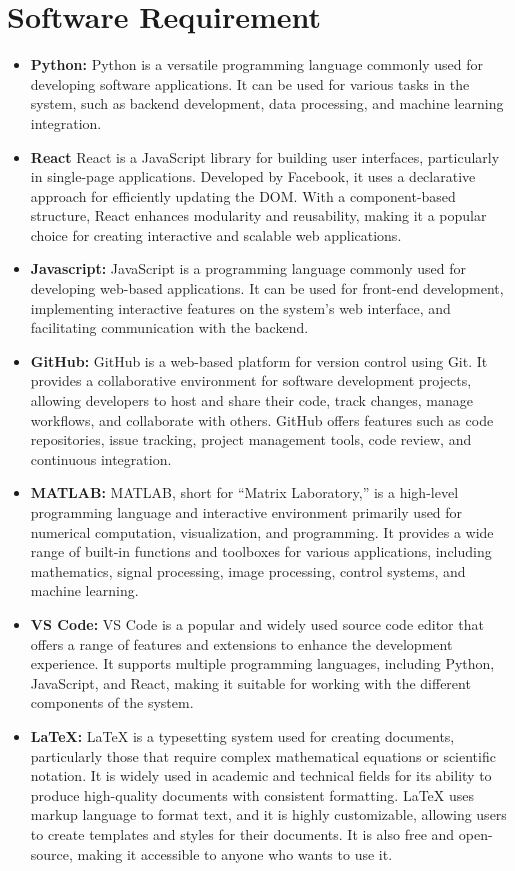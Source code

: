 \section{Software Requirement}
\begin{itemize}[noitemsep]
\item \textbf{Python:} 
Python is a versatile programming language commonly used for \mbox{developing} software applications. It can be used for various tasks in the system, such as backend development, data processing, and machine learning integration.
\item \textbf{React }
 React is a JavaScript library for building user interfaces, particularly in single-page applications. Developed by Facebook, it uses a declarative approach for efficiently updating the DOM. With a component-based structure, React enhances modularity and reusability, making it a popular choice for creating interactive and scalable web applications.
\item \textbf{Javascript:}
JavaScript is a programming language commonly used for developing web-based applications. It can be used for front-end development, implementing interactive features on the system’s web interface, and facilitating communication with the backend. 
\item \textbf{GitHub:}
GitHub is a web-based platform for version control using Git. It provides a collaborative environment for software development projects, allowing developers to host and share their code, track changes, manage workflows, and collaborate with others. GitHub offers features such as code repositories, issue tracking, project management tools, code review, and continuous integration.
\item \textbf{MATLAB:}
MATLAB, short for ``Matrix Laboratory,'' is a high-level programming language and interactive environment primarily used for numerical computation, visualization, and programming. It provides a wide range of built-in functions and toolboxes for various applications, including mathematics, signal processing, image processing, control systems, and machine learning.
\item \textbf{VS Code:}
VS Code is a popular and widely used source code editor that offers a range of features and extensions to enhance the development experience. It supports multiple programming languages, including Python, JavaScript, and React, making it suitable for working with the different components of the system. 
\item \textbf{LaTeX:}
LaTeX is a typesetting system used for creating documents, particularly those that require complex mathematical equations or scientific notation. It is widely used in academic and technical fields for its ability to produce high-quality documents with consistent formatting. LaTeX uses markup language to format text, and it is highly customizable, allowing users to create templates and styles for their documents. It is also free and open-source, making it accessible to anyone who wants to use it.

\end{itemize}


